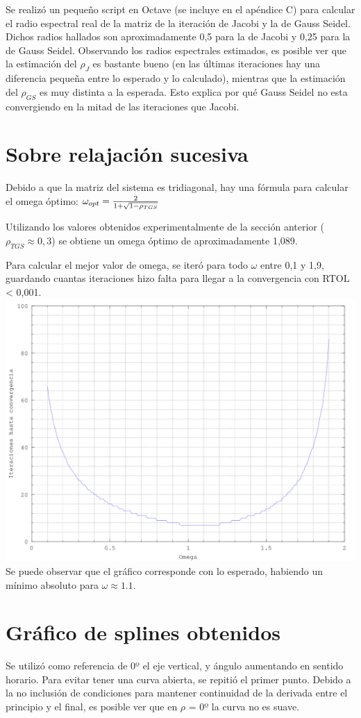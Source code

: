\documentclass[12pt,spanish]{article}
\begin{document}
Se realizó un pequeño script en Octave (se incluye en el apéndice C) para calcular el radio espectral real de la matriz de la iteración de Jacobi y la de Gauss Seidel. Dichos radios hallados son aproximadamente 0,5 para la de Jacobi y 0,25 para la de Gauss Seidel. Observando los radios espectrales estimados, es posible ver que la estimación del $\rho_J$ es bastante bueno (en las últimas iteraciones hay una diferencia pequeña entre lo esperado y lo calculado), mientras que la estimación del $\rho_{GS}$ es muy distinta a la esperada. Esto explica por qué Gauss Seidel no esta convergiendo en la mitad de las iteraciones que Jacobi.

\section*{Sobre relajación sucesiva}
Debido a que la matriz del sistema es tridiagonal, hay una fórmula para calcular el omega óptimo: 
$\omega _{opt} = {2 \over {1+ \sqrt{1-\rho_{TGS}}}}$

Utilizando los valores obtenidos experimentalmente de la sección anterior ($\rho_{TGS} \approx 0,3$) se obtiene un omega óptimo de aproximadamente 1,089.

Para calcular el mejor valor de omega, se iteró para todo $\omega$ entre 0,1 y 1,9, guardando cuantas iteraciones hizo falta para llegar a la convergencia con RTOL < 0,001.
\includegraphics[scale=0.8]{../extras/omega.png}
Se puede observar que el gráfico corresponde con lo esperado, habiendo un mínimo absoluto para $\omega \approx 1.1$.

\section*{Gráfico de splines obtenidos}
Se utilizó como referencia de 0º el eje vertical, y ángulo aumentando en sentido horario.
Para evitar tener una curva abierta, se repitió el primer punto. Debido a la no inclusión de condiciones para mantener continuidad de la derivada entre el principio y el final, es posible ver que en $\rho$ = 0º la curva no es suave.
\end{document}
